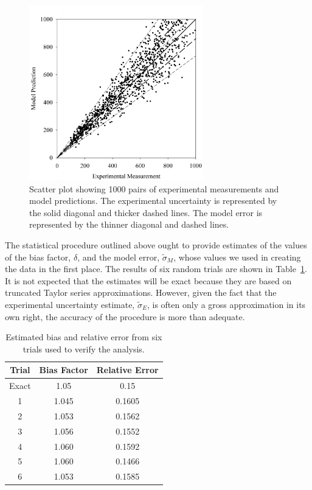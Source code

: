 \begin{figure}[ht]
\begin{center}
\includegraphics[height=3.0in]{FIGURES/scatterplot_1000}
\end{center}
\caption[Scatter plot for verification of model error calculation.]{Scatter plot showing 1000 pairs of experimental measurements and model predictions. The
experimental uncertainty is represented by the solid diagonal and thicker dashed lines. The model error is represented by the thinner diagonal and dashed lines.}
\label{scatterplot_1000}
\end{figure}

The statistical procedure outlined above ought to provide estimates of the values of the bias factor, $\delta$, and the model error, $\widetilde{\sigma}_M$, whose
values we used in creating the data in the first place. The results of six random trials are shown in Table~\ref{trials}. It is not expected that the
estimates will be exact because they are based on truncated Taylor series approximations. However, given the fact that the experimental uncertainty estimate,
$\widetilde{\sigma}_E$, is often only a gross approximation in its own right, the accuracy of the procedure is more than adequate.

\begin{table}[ht!]
\caption{Estimated bias and relative error from six trials used to verify the analysis. }
\begin{center}
\begin{tabular}{|c|c|c|}
\hline
Trial   & Bias Factor      & Relative Error \\ \hline \hline
Exact   & 1.05             &    0.15            \\ \hline \hline
1       & 1.045            &    0.1605            \\ \hline
2       & 1.053            &    0.1562            \\ \hline
3       & 1.056            &    0.1552            \\ \hline
4       & 1.060            &    0.1592            \\ \hline
5       & 1.060            &    0.1466            \\ \hline
6       & 1.053            &    0.1585            \\ \hline
\end{tabular}
\end{center}
\label{trials}
\end{table}



